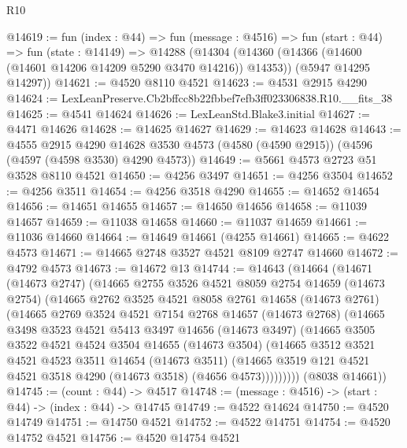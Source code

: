 \begin{lexlean}{R10}
\begin{coremodule}
@14619 := fun (index : @44) =>
  fun (message : @4516) =>
  fun (start : @44) =>
  fun (state : @14149) =>
  @14288
    (@14304
      (@14360 (@14366 (@14600 (@14601 @14206 @14209 @5290 @3470 @14216)) @14353))
      (@5947 @14295 @14297))
@14621 := @4520 @8110 @4521
@14623 := @4531 @2915 @4290
@14624 := LexLeanPreserve.Cb2bffcc8b22fbbef7efb3ff023306838.R10.__fits_38
@14625 := @4541 @14624
@14626 := LexLeanStd.Blake3.initial
@14627 := @4471 @14626
@14628 := @14625 @14627
@14629 := @14623 @14628
@14643 := @4555
    @2915
    @4290
    @14628
    @3530
    @4573
    (@4580 (@4590 @2915))
    (@4596 (@4597 (@4598 @3530) @4290 @4573))
@14649 := @5661 @4573 @2723 @51 @3528 @8110 @4521
@14650 := @4256 @3497
@14651 := @4256 @3504
@14652 := @4256 @3511
@14654 := @4256 @3518 @4290
@14655 := @14652 @14654
@14656 := @14651 @14655
@14657 := @14650 @14656
@14658 := @11039 @14657
@14659 := @11038 @14658
@14660 := @11037 @14659
@14661 := @11036 @14660
@14664 := @14649 @14661 (@4255 @14661)
@14665 := @4622 @4573
@14671 := @14665 @2748 @3527 @4521 @8109 @2747 @14660
@14672 := @4792 @4573
@14673 := @14672 @13
@14744 := @14643
    (@14664
      (@14671
        (@14673 @2747)
        (@14665
          @2755
          @3526
          @4521
          @8059
          @2754
          @14659
          (@14673 @2754)
          (@14665
            @2762
            @3525
            @4521
            @8058
            @2761
            @14658
            (@14673 @2761)
            (@14665
              @2769
              @3524
              @4521
              @7154
              @2768
              @14657
              (@14673 @2768)
              (@14665
                @3498
                @3523
                @4521
                @5413
                @3497
                @14656
                (@14673 @3497)
                (@14665
                  @3505
                  @3522
                  @4521
                  @4524
                  @3504
                  @14655
                  (@14673 @3504)
                  (@14665
                    @3512
                    @3521
                    @4521
                    @4523
                    @3511
                    @14654
                    (@14673 @3511)
                    (@14665 @3519 @121 @4521 @4521 @3518 @4290 (@14673 @3518) (@4656 @4573)))))))))
      (@8038 @14661))
@14745 := (count : @44) -> @4517
@14748 := (message : @4516) -> (start : @44) -> (index : @44) -> @14745
@14749 := @4522 @14624
@14750 := @4520 @14749
@14751 := @14750 @4521
@14752 := @4522 @14751
@14754 := @4520 @14752 @4521
@14756 := @4520 @14754 @4521

\end{coremodule}
\end{lexlean}
